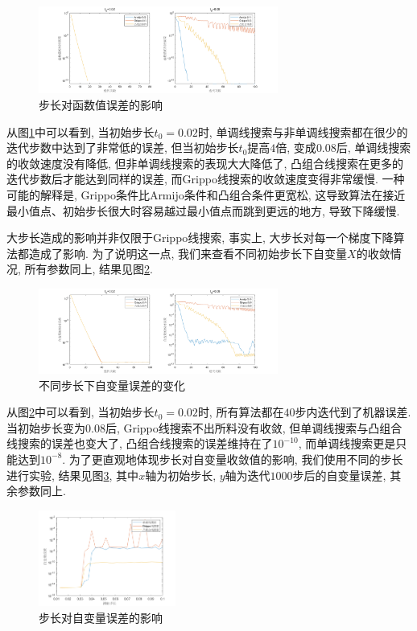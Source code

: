 \documentclass[UTF8]{ctexart}
\begin{document}
\begin{figure}[htb]
    \centering
    \includegraphics[width=0.7\textwidth]{Q2-figure/3.png}
    \caption{步长对函数值误差的影响}\label{fig3}
\end{figure}

从图\ref{fig3}中可以看到, 当初始步长$t_0=0.02$时, 单调线搜索与非单调线搜索都在很少的迭代步数中达到了非常低的误差, 但当初始步长$t_0$提高$4$倍, 变成$0.08$后, 单调线搜索的收敛速度没有降低, 但非单调线搜索的表现大大降低了, 凸组合线搜索在更多的迭代步数后才能达到同样的误差, 而Grippo线搜索的收敛速度变得非常缓慢. 一种可能的解释是, Grippo条件比Armijo条件和凸组合条件更宽松, 这导致算法在接近最小值点、初始步长很大时容易越过最小值点而跳到更远的地方, 导致下降缓慢. 

大步长造成的影响并非仅限于Grippo线搜索, 事实上, 大步长对每一个梯度下降算法都造成了影响. 为了说明这一点, 我们来查看不同初始步长下自变量$X$的收敛情况, 所有参数同上, 结果见图\ref{fig4}. 

\begin{figure}[htb]
    \centering
    \includegraphics[width=0.7\textwidth]{Q2-figure/4.png}
    \caption{不同步长下自变量误差的变化}\label{fig4}
\end{figure}

从图\ref{fig4}中可以看到, 当初始步长$t_0=0.02$时, 所有算法都在$40$步内迭代到了机器误差. 当初始步长变为$0.08$后, Grippo线搜索不出所料没有收敛, 但单调线搜索与凸组合线搜索的误差也变大了, 凸组合线搜索的误差维持在了$10^{-10}$, 而单调线搜索更是只能达到$10^{-8}$. 为了更直观地体现步长对自变量收敛值的影响, 我们使用不同的步长进行实验, 结果见图\ref{fig5}, 其中$x$轴为初始步长, $y$轴为迭代$1000$步后的自变量误差, 其余参数同上. 

\begin{figure}[htb]
    \centering
    \includegraphics[width=0.4\textwidth]{Q2-figure/5.png}
    \caption{步长对自变量误差的影响}\label{fig5}
\end{figure}
\end{document}

